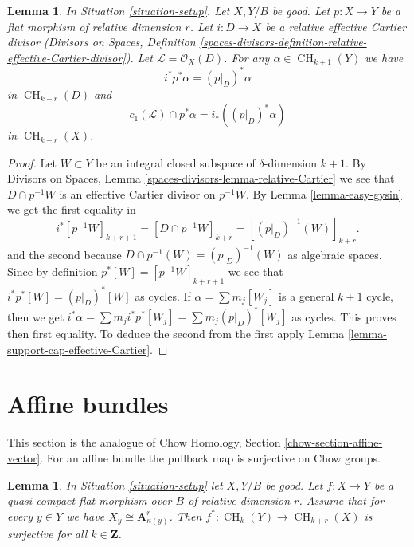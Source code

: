\documentclass{stacks-project}
\theoremstyle{plain}
\newtheorem{lemma}[subsection]{Lemma}
\theoremstyle{definition}
\theoremstyle{remark}
\numberwithin{equation}{subsection}
\def\CH{\mathop{\mathrm{CH}}\nolimits}
\begin{document}
\begin{lemma}
\label{lemma-relative-effective-cartier}
In Situation \ref{situation-setup}. Let $X, Y/B$ be good.
Let $p : X \to Y$ be a flat morphism of relative dimension $r$.
Let $i : D \to X$ be a relative effective Cartier divisor
(Divisors on Spaces, Definition
\ref{spaces-divisors-definition-relative-effective-Cartier-divisor}).
Let $\mathcal{L} = \mathcal{O}_X(D)$.
For any $\alpha \in \CH_{k + 1}(Y)$ we have
$$
i^*p^*\alpha = (p|_D)^*\alpha
$$
in $\CH_{k + r}(D)$ and
$$
c_1(\mathcal{L}) \cap p^*\alpha = i_* ((p|_D)^*\alpha)
$$
in $\CH_{k + r}(X)$.
\end{lemma}

\begin{proof}
Let $W \subset Y$ be an integral closed subspace of $\delta$-dimension
$k + 1$. By Divisors on Spaces, Lemma
\ref{spaces-divisors-lemma-relative-Cartier}
we see that $D \cap p^{-1}W$ is an effective
Cartier divisor on $p^{-1}W$. By Lemma \ref{lemma-easy-gysin}
we get the first equality in
$$
i^*[p^{-1}W]_{k + r + 1} =
[D \cap p^{-1}W]_{k + r} =
[(p|_D)^{-1}(W)]_{k + r}.
$$
and the second because $D \cap p^{-1}(W) = (p|_D)^{-1}(W)$ as algebraic spaces.
Since by definition $p^*[W] = [p^{-1}W]_{k + r + 1}$ we see that
$i^*p^*[W] = (p|_D)^*[W]$ as cycles. If $\alpha = \sum m_j[W_j]$ is a
general $k + 1$ cycle, then we get
$i^*\alpha = \sum m_j i^*p^*[W_j] = \sum m_j(p|_D)^*[W_j]$ as cycles.
This proves then first equality. To deduce the second from the
first apply Lemma \ref{lemma-support-cap-effective-Cartier}.
\end{proof}












\section{Affine bundles}
\label{section-affine-vector}

\noindent
This section is the analogue of
Chow Homology, Section \ref{chow-section-affine-vector}.
For an affine bundle the pullback map is surjective on Chow groups.

\begin{lemma}
\label{lemma-pullback-affine-fibres-surjective}
In Situation \ref{situation-setup} let $X, Y/B$ be good.
Let $f : X \to Y$ be a quasi-compact flat morphism over $B$
of relative dimension $r$. Assume that for every $y \in Y$ we have
$X_y \cong \mathbf{A}^r_{\kappa(y)}$.
Then $f^* : \CH_k(Y) \to \CH_{k + r}(X)$ is surjective for all
$k \in \mathbf{Z}$.
\end{lemma}
\end{document}
